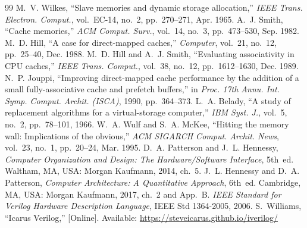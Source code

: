 \documentclass[conference]{IEEEtran}
\begin{document}
\begin{thebibliography}{99}
 M.~V. Wilkes, ``Slave memories and dynamic storage allocation,'' \emph{IEEE Trans. Electron. Comput.}, vol.~EC-14, no.~2, pp.~270--271, Apr. 1965.
 A.~J. Smith, ``Cache memories,'' \emph{ACM Comput. Surv.}, vol.~14, no.~3, pp.~473--530, Sep. 1982.
 M.~D. Hill, ``A case for direct-mapped caches,'' \emph{Computer}, vol.~21, no.~12, pp.~25--40, Dec. 1988.
 M.~D. Hill and A.~J. Smith, ``Evaluating associativity in CPU caches,'' \emph{IEEE Trans. Comput.}, vol.~38, no.~12, pp.~1612--1630, Dec. 1989.
 N.~P. Jouppi, ``Improving direct-mapped cache performance by the addition of a small fully-associative cache and prefetch buffers,'' in \emph{Proc. 17th Annu. Int. Symp. Comput. Archit. (ISCA)}, 1990, pp.~364--373.
 L.~A. Belady, ``A study of replacement algorithms for a virtual-storage computer,'' \emph{IBM Syst. J.}, vol.~5, no.~2, pp.~78--101, 1966.
 W.~A. Wulf and S.~A. McKee, ``Hitting the memory wall: Implications of the obvious,'' \emph{ACM SIGARCH Comput. Archit. News}, vol.~23, no.~1, pp.~20--24, Mar. 1995.
 D.~A. Patterson and J.~L. Hennessy, \emph{Computer Organization and Design: The Hardware/Software Interface}, 5th~ed. Waltham, MA, USA: Morgan Kaufmann, 2014, ch.~5.
 J.~L. Hennessy and D.~A. Patterson, \emph{Computer Architecture: A Quantitative Approach}, 6th~ed. Cambridge, MA, USA: Morgan Kaufmann, 2017, ch.~2 and App.~B.
 \emph{IEEE Standard for Verilog Hardware Description Language}, IEEE Std 1364-2005, 2006.
 S.~Williams, ``Icarus Verilog,'' [Online]. Available: \url{https://steveicarus.github.io/iverilog/}
\end{thebibliography}
\end{document}

